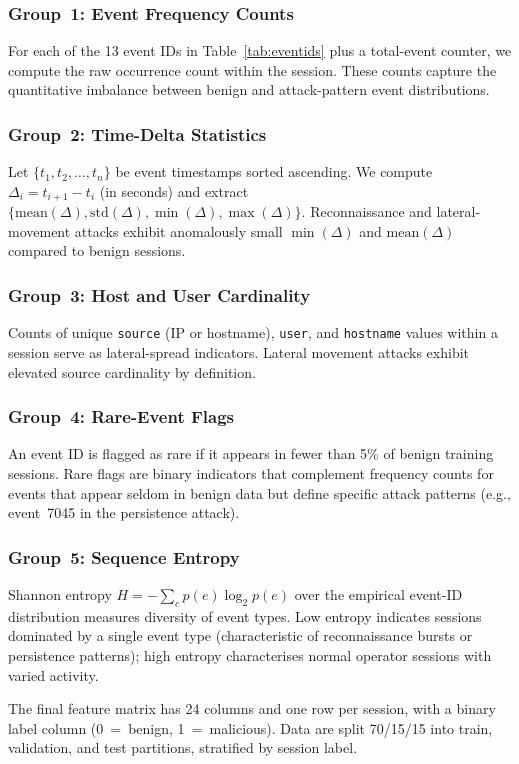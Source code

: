 \subsubsection{Group~1: Event Frequency Counts}
For each of the 13 event IDs in Table~\ref{tab:eventids} plus a total-event counter,
we compute the raw occurrence count within the session. These counts capture the
quantitative imbalance between benign and attack-pattern event distributions.

\subsubsection{Group~2: Time-Delta Statistics}
Let $\{t_1, t_2, \ldots, t_n\}$ be event timestamps sorted ascending. We compute
$\Delta_i = t_{i+1} - t_i$ (in seconds) and extract $\{\text{mean}(\Delta), \text{std}(\Delta),
\min(\Delta), \max(\Delta)\}$. Reconnaissance and lateral-movement attacks exhibit
anomalously small $\min(\Delta)$ and $\text{mean}(\Delta)$ compared to benign sessions.

\subsubsection{Group~3: Host and User Cardinality}
Counts of unique \texttt{source} (IP or hostname), \texttt{user}, and \texttt{hostname}
values within a session serve as lateral-spread indicators. Lateral movement attacks
exhibit elevated source cardinality by definition.

\subsubsection{Group~4: Rare-Event Flags}
An event ID is flagged as rare if it appears in fewer than 5\% of benign training sessions.
Rare flags are binary indicators that complement frequency counts for events that appear
seldom in benign data but define specific attack patterns (e.g., event~7045 in the
persistence attack).

\subsubsection{Group~5: Sequence Entropy}
Shannon entropy $H = -\sum_{e} p(e) \log_2 p(e)$ over the empirical event-ID distribution
measures diversity of event types. Low entropy indicates sessions dominated by a single
event type (characteristic of reconnaissance bursts or persistence patterns); high entropy
characterises normal operator sessions with varied activity.

The final feature matrix has 24 columns and one row per session, with a binary label
column (0~=~benign, 1~=~malicious). Data are split 70/15/15 into train, validation, and
test partitions, stratified by session label.
